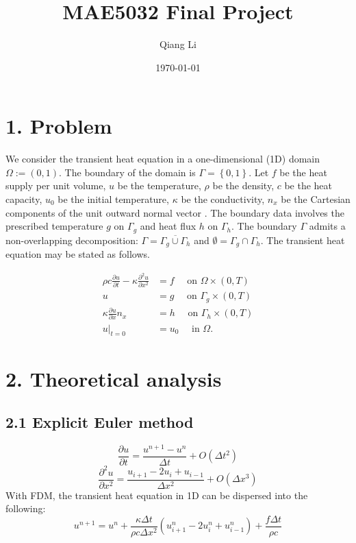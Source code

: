 \documentclass[12pt]{article}
\begin{document}
\title{\bf MAE5032 Final Project}
\author{Qiang Li}
\date{\today}
\maketitle

\section*{1. Problem}
We consider the transient heat equation in a one-dimensional (1D) domain $\Omega := (0,1)$. The boundary of the domain is $\Gamma = \left\lbrace 0, 1 \right\rbrace$.
Let $f$ be the heat supply per unit volume, $u$ be the temperature,  $\rho$ be the density, $c$ be the heat capacity, $u_0$ be the initial temperature, $\kappa$ be the conductivity, $n_x$ be the Cartesian components of the unit outward normal vector . The boundary data involves the prescribed temperature $g$ on $\Gamma_g$ and heat flux $h$ on $\Gamma_h$. The boundary $\Gamma$ admits a non-overlapping decomposition: $\Gamma = \overline{\Gamma_{g} \cup \Gamma_h}$ and $\emptyset = \Gamma_g \cap \Gamma_h$. The transient heat equation may be stated as follows.

\begin{align*}
\rho c \frac{\partial u}{\partial t} - \kappa  \frac{\partial^2 u}{\partial x^2} &= f \quad \mbox{ on } \Omega \times (0,T) \\
u &= g \quad \mbox{ on } \Gamma_{g} \times (0,T) \\
\kappa \frac{\partial u}{\partial x} n_{x}  &= h \quad \mbox{ on } \Gamma_h \times (0,T) \\
u|_{t=0} &= u_0 \quad \mbox{ in } \Omega.
\end{align*}

\section*{2. Theoretical analysis}
\subsection*{2.1 Explicit Euler method}
\begin{equation}
    \frac{\partial u}{\partial t}=\frac{u^{n+1}-u^n}{\Delta t}+O(\Delta t^2)\label{partial time}
\end{equation}
\begin{equation}
    \frac{\partial^2 u}{\partial x^2}=\frac{u_{i+1}-2u_i+u_{i-1}}{\Delta x^2}+O(\Delta x^3)\label{partial u}
\end{equation}
With FDM, the transient heat equation in 1D can be dispersed into the following:
\begin{equation}
    u^{n+1}=u^n+\frac{\kappa\Delta t}{\rho c\Delta x^2}(u_{i+1}^n-2u_i^n+u_{i-1}^n)+\frac{f\Delta t}{\rho c}
\end{equation}
\end{document}
